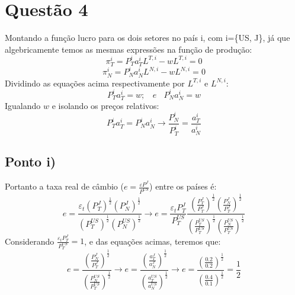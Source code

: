 \documentclass{article}
\begin{document}
\section*{Questão 4}
Montando a função lucro para os dois setores no país i, com i=\{US, J\}, já que algebricamente temos as mesmas expressões na função de produção:
\begin{equation*}
    \pi_T^{i} = P_T^{i} a_T^{i}L^{T,i}-wL^{T,i} = 0
\end{equation*}
\begin{equation*}
    \pi_N^{i} = P_N^{i} a_N^{i}L^{N,i}-wL^{N,i} = 0
\end{equation*}
Dividindo as equações acima respectivamente por $L^{T,i}$ e $L^{N,i}$:
\begin{equation*}
    P_T^{i} a_T^{i}=w ; \>\>\>\> e \>\>\>\> P_N^{i} a_N^{i}=w
\end{equation*}
Igualando $w$ e isolando os preços relativos:
\begin{equation*}
    P_T^{i} a_T^{i}=P_N^{i} a_N^{i} \to 
    \frac{P_N^{i}}{P_T^{i}}=\frac{a_T^{i}}{a_N^{i}}
\end{equation*}
\subsection*{Ponto i)}
Portanto a taxa real de câmbio ($e=\frac{\varepsilon P^J}{P^{US}}$) entre os países é:
\begin{equation*}
    e=\frac{\varepsilon_t (P_T^{J})^\frac{1}{2}(P_N^J)^\frac{1}{2}}{(P_T^{US})^\frac{1}{2}(P_N^{US})^\frac{1}{2}} \to 
    e= \frac{\varepsilon_t P_T^J}{P_T^{US}}\frac{ \left(\frac{P_T^{J}}{P_T^J}\right)^\frac{1}{2}\left(\frac{P_N^J}{P_T^J}\right)^\frac{1}{2}}{\left(\frac{P_T^{US}}{P_T^{US}}\right)^\frac{1}{2}\left(\frac{P_N^{US}}{P_T^{US}}\right)^\frac{1}{2}}
\end{equation*}
Considerando $\frac{\varepsilon_t P_T^J}{P_T^{US}}=1$, e das equações acimas, teremos que:
\begin{equation*}
    e= \frac{\left(\frac{P_N^J}{P_T^J}\right)^\frac{1}{2}}{\left(\frac{P_N^{US}}{P_T^{US}}\right)^\frac{1}{2}} \to 
    e=\frac{\left(\frac{a_T^J}{a_N^J}\right)^\frac{1}{2}}{\left(\frac{a_T^{US}}{a_N^{US}}\right)^\frac{1}{2}} \to 
    e=\frac{\left(\frac{0.2}{0.2}\right)^\frac{1}{2}}{\left(\frac{0.4}{0.1}\right)^\frac{1}{2}}=\frac{1}{2}
\end{equation*}
\end{document}
